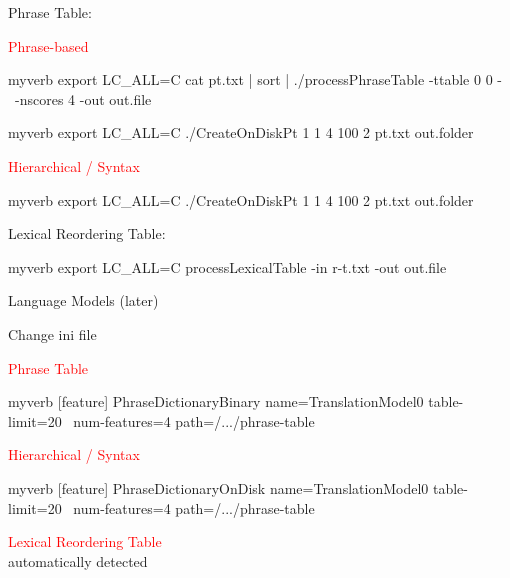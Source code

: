 \documentclass[landscape]{uedslides2C}
\begin{document}

\small
Phrase Table:  
\begin{center}
\small
\textcolor{red}{Phrase-based} \\
\begin{SaveVerbatim}{myverb} 
  export LC_ALL=C 
  cat pt.txt | sort | ./processPhraseTable -ttable 0 0 -  \
      -nscores 4 -out out.file
\end{SaveVerbatim}
\colorbox{gray}{}

\begin{SaveVerbatim}{myverb} 
  export LC_ALL=C   ./CreateOnDiskPt 1 1 4 100 2 pt.txt out.folder
\end{SaveVerbatim}
\colorbox{gray}{}

\end{center}


\begin{center}
\small
\textcolor{red}{Hierarchical / Syntax} \\
\begin{SaveVerbatim}{myverb} 
  export LC_ALL=C ./CreateOnDiskPt 1 1 4 100 2 pt.txt out.folder
\end{SaveVerbatim}
\colorbox{gray}{}
\end{center}

Lexical Reordering Table:  
\begin{center}
\small
\begin{SaveVerbatim}{myverb} 
  export LC_ALL=C
  processLexicalTable -in r-t.txt -out out.file
\end{SaveVerbatim}
\colorbox{gray}{}
\end{center}

Language Models (later)



Change ini file \\[-6mm]
\begin{center}
\textcolor{red}{Phrase Table} \\[2mm]
{\small
\begin{SaveVerbatim}{myverb} 
[feature]
PhraseDictionaryBinary name=TranslationModel0 table-limit=20 \ 
   num-features=4 path=/.../phrase-table
\end{SaveVerbatim}
\colorbox{gray}{}
}
\vspace{5mm}

\textcolor{red}{Hierarchical / Syntax} \\[2mm]
{\small
\begin{SaveVerbatim}{myverb} 
[feature]
PhraseDictionaryOnDisk name=TranslationModel0 table-limit=20 \ 
   num-features=4 path=/.../phrase-table
\end{SaveVerbatim}
\colorbox{gray}{\BUseVerbatim{myverb}}
}
\vspace{5mm}

\textcolor{red}{Lexical Reordering Table} \\
automatically detected
\end{center}
\end{document}
